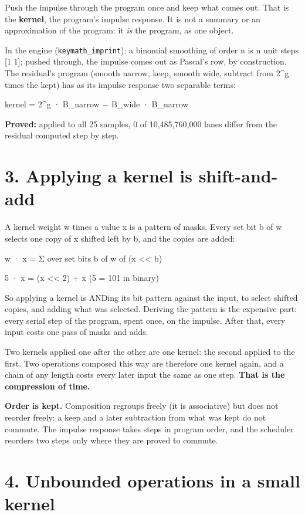Push the impulse through the program once and keep what comes out. That is the \textbf{kernel}, the program's impulse response. It is not a summary or an approximation of the program: it \emph{is} the program, as one object.

In the engine (\texttt{keymath\_\allowbreak{}imprint}): a binomial smoothing of order n is n unit steps [1 1]; pushed through, the impulse comes out as Pascal's row, by construction. The residual's program (smooth narrow, keep, smooth wide, subtract from 2\textasciicircum{}g times the kept) has as its impulse response two separable terms:

kernel = 2\textasciicircum{}g · B\_\allowbreak{}narrow − B\_\allowbreak{}wide · B\_\allowbreak{}narrow

\textbf{Proved:} applied to all 25 samples, 0 of 10,485,760,000 lanes differ from the residual computed step by step.

\section{\texorpdfstring{3. Applying a kernel is shift-and-add}{3. Applying a kernel is shift-and-add}}

A kernel weight w times a value x is a pattern of masks. Every set bit b of w selects one copy of x shifted left by b, and the copies are added:

w · x = Σ over set bits b of w of (x << b)

5 · x = (x << 2) + x         (5 = 101 in binary)

So applying a kernel is ANDing its bit pattern against the input, to select shifted copies, and adding what was selected. Deriving the pattern is the expensive part: every serial step of the program, spent once, on the impulse. After that, every input costs one pass of masks and adds.

Two kernels applied one after the other are one kernel: the second applied to the first. Two operations composed this way are therefore one kernel again, and a chain of any length costs every later input the same as one step. \textbf{That is the compression of time.}

\textbf{Order is kept.} Composition regroups freely (it is associative) but does not reorder freely: a keep and a later subtraction from what was kept do not commute. The impulse response takes steps in program order, and the scheduler reorders two steps only where they are proved to commute.

\section{\texorpdfstring{4. Unbounded operations in a small kernel}{4. Unbounded operations in a small kernel}}


